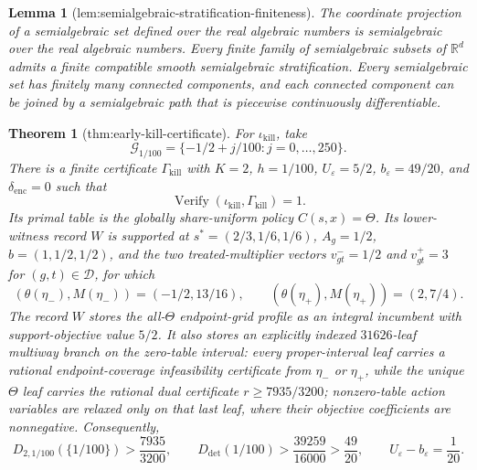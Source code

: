 \documentclass{article}
\newtheorem{theorem}{Theorem}
\newtheorem{lemma}{Lemma}
\begin{document}
\begin{lemma}[lem:semialgebraic-stratification-finiteness]\label{lem:semialgebraic-stratification-finiteness}
The coordinate projection of a semialgebraic set defined over the real algebraic numbers is semialgebraic over the real algebraic numbers.  Every finite family of semialgebraic subsets of \(\mathbb R^d\) admits a finite compatible smooth semialgebraic stratification.  Every semialgebraic set has finitely many connected components, and each connected component can be joined by a semialgebraic path that is piecewise continuously differentiable.
\end{lemma}

\begin{theorem}[thm:early-kill-certificate]\label{thm:early-kill-certificate}
For \(\iota_{\mathrm{kill}}\), take
\[
 \mathcal G_{1/100}=\{-1/2+j/100:j=0,\ldots,250\}.
\]
There is a finite certificate \(\Gamma_{\mathrm{kill}}\) with \(K=2\), \(h=1/100\), \(U_\varepsilon=5/2\), \(b_\varepsilon=49/20\), and \(\delta_{\mathrm{enc}}=0\) such that
\[
 \operatorname{Verify}(\iota_{\mathrm{kill}},\Gamma_{\mathrm{kill}})=1.
\]
Its primal table is the globally share-uniform policy \(C(s,x)=\Theta\). Its lower-witness record \(W\) is supported at \(s^*=(2/3,1/6,1/6)\), \(A_g=1/2\), \(b=(1,1/2,1/2)\), and the two treated-multiplier vectors \(v^-_{gt}=1/2\) and \(v^+_{gt}=3\) for \((g,t)\in\mathcal D\), for which
\[
 (\theta(\eta_-),M(\eta_-))=(-1/2,13/16),\qquad
 (\theta(\eta_+),M(\eta_+))=(2,7/4).
\]
The record \(W\) stores the all-\(\Theta\) endpoint-grid profile as an integral incumbent with support-objective value \(5/2\). It also stores an explicitly indexed \(31626\)-leaf multiway branch on the zero-table interval: every proper-interval leaf carries a rational endpoint-coverage infeasibility certificate from \(\eta_-\) or \(\eta_+\), while the unique \(\Theta\) leaf carries the rational dual certificate \(r\ge7935/3200\); nonzero-table action variables are relaxed only on that last leaf, where their objective coefficients are nonnegative. Consequently,
\[
 D_{2,1/100}(\{1/100\})>\frac{7935}{3200},
 \qquad
 D_{\mathrm{det}}(1/100)>\frac{39259}{16000}>\frac{49}{20},
 \qquad
 U_\varepsilon-b_\varepsilon=\frac1{20}.
\]
\end{theorem}
\end{document}
